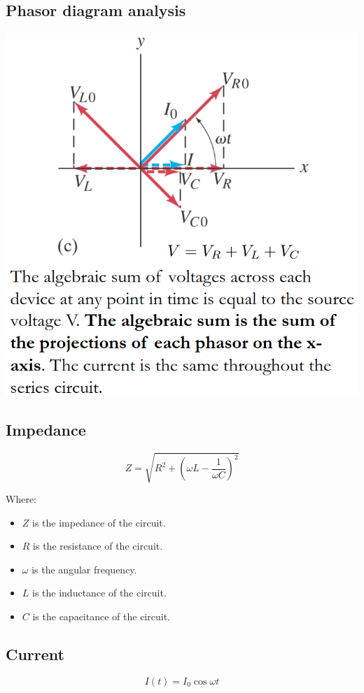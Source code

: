 \documentclass[11pt]{article}
\begin{document}
\subsection{Phasor diagram analysis}
\label{sec:org19ffac3}
\begin{center}
\includegraphics[width=.9\linewidth]{./images/rcl-circuit-phasor-diagram.png}
\end{center}

\subsection{Impedance}
\label{sec:org3aad5c1}
\[Z = \sqrt{R^2 + \left(\omega L - \frac{1}{\omega C} \right)^2}\]

Where:
\begin{itemize}
\item \(Z\) is the impedance of the circuit.
\item \(R\) is the resistance of the circuit.
\item \(\omega\) is the angular frequency.
\item \(L\) is the inductance of the circuit.
\item \(C\) is the capacitance of the circuit.
\end{itemize}

\subsection{Current}
\label{sec:org76fbd0e}
\[I(t) = I_0 \cos \omega t\]
\end{document}
